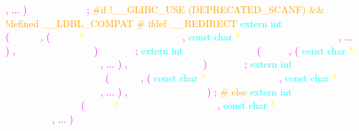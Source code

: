 \textcolor{magenta}{,} 
\textcolor{magenta}{...} 
\textcolor{magenta}{)} 
\textcolor{white}{\_\_THROW} 
\textcolor{magenta}{;} 
\textcolor{orange}{\#if !\_\_GLIBC\_USE (DEPRECATED\_SCANF) \&\& !defined \_\_LDBL\_COMPAT} 
\textcolor{orange}{\# ifdef \_\_REDIRECT} 
\textcolor{cyan}{extern} 
\textcolor{cyan}{int} 
\textcolor{white}{\_\_REDIRECT} 
\textcolor{magenta}{(} 
\textcolor{white}{fscanf} 
\textcolor{magenta}{,} 
\textcolor{magenta}{(} 
\textcolor{white}{FILE} 
\textcolor{yellow}{*} 
\textcolor{white}{\_\_restrict} 
\textcolor{white}{\_\_stream} 
\textcolor{magenta}{,} 
\textcolor{cyan}{const} 
\textcolor{cyan}{char} 
\textcolor{yellow}{*} 
\textcolor{white}{\_\_restrict} 
\textcolor{white}{\_\_format} 
\textcolor{magenta}{,} 
\textcolor{magenta}{...} 
\textcolor{magenta}{)} 
\textcolor{magenta}{,} 
\textcolor{white}{\_\_isoc99\_fscanf} 
\textcolor{magenta}{)} 
\textcolor{white}{\_\_wur} 
\textcolor{magenta}{;} 
\textcolor{cyan}{extern} 
\textcolor{cyan}{int} 
\textcolor{white}{\_\_REDIRECT} 
\textcolor{magenta}{(} 
\textcolor{white}{scanf} 
\textcolor{magenta}{,} 
\textcolor{magenta}{(} 
\textcolor{cyan}{const} 
\textcolor{cyan}{char} 
\textcolor{yellow}{*} 
\textcolor{white}{\_\_restrict} 
\textcolor{white}{\_\_format} 
\textcolor{magenta}{,} 
\textcolor{magenta}{...} 
\textcolor{magenta}{)} 
\textcolor{magenta}{,} 
\textcolor{white}{\_\_isoc99\_scanf} 
\textcolor{magenta}{)} 
\textcolor{white}{\_\_wur} 
\textcolor{magenta}{;} 
\textcolor{cyan}{extern} 
\textcolor{cyan}{int} 
\textcolor{white}{\_\_REDIRECT\_NTH} 
\textcolor{magenta}{(} 
\textcolor{white}{sscanf} 
\textcolor{magenta}{,} 
\textcolor{magenta}{(} 
\textcolor{cyan}{const} 
\textcolor{cyan}{char} 
\textcolor{yellow}{*} 
\textcolor{white}{\_\_restrict} 
\textcolor{white}{\_\_s} 
\textcolor{magenta}{,} 
\textcolor{cyan}{const} 
\textcolor{cyan}{char} 
\textcolor{yellow}{*} 
\textcolor{white}{\_\_restrict} 
\textcolor{white}{\_\_format} 
\textcolor{magenta}{,} 
\textcolor{magenta}{...} 
\textcolor{magenta}{)} 
\textcolor{magenta}{,} 
\textcolor{white}{\_\_isoc99\_sscanf} 
\textcolor{magenta}{)} 
\textcolor{magenta}{;} 
\textcolor{orange}{\# else} 
\textcolor{cyan}{extern} 
\textcolor{cyan}{int} 
\textcolor{white}{\_\_isoc99\_fscanf} 
\textcolor{magenta}{(} 
\textcolor{white}{FILE} 
\textcolor{yellow}{*} 
\textcolor{white}{\_\_restrict} 
\textcolor{white}{\_\_stream} 
\textcolor{magenta}{,} 
\textcolor{cyan}{const} 
\textcolor{cyan}{char} 
\textcolor{yellow}{*} 
\textcolor{white}{\_\_restrict} 
\textcolor{white}{\_\_format} 
\textcolor{magenta}{,} 
\textcolor{magenta}{...} 
\textcolor{magenta}{)} 

